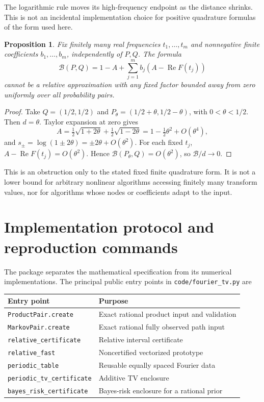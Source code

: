 \documentclass[11pt]{article}
\newtheorem{proposition}[theorem]{Proposition}
\theoremstyle{definition}
\theoremstyle{remark}
\DeclareMathOperator{\Rea}{Re}
\begin{document}
The logarithmic rule moves its high-frequency endpoint as the distance shrinks. This is not an incidental implementation choice for positive quadrature formulas of the form used here.

\begin{proposition}
\label{prop:fixedrule}
Fix finitely many real frequencies $t_1,\ldots,t_m$ and nonnegative finite coefficients $b_1,\ldots,b_m$, independently of $P,Q$. The formula
\[
 \mathcal B(P,Q)=1-A+\sum_{j=1}^m b_j(A-\Rea F(t_j))
\]
cannot be a relative approximation with any fixed factor bounded away from zero uniformly over all probability pairs.
\end{proposition}
\begin{proof}
Take $Q=(1/2,1/2)$ and $P_\theta=(1/2+\theta,1/2-\theta)$, with $0<\theta<1/2$. Then $d=\theta$. Taylor expansion at zero gives
\[
 A=\tfrac12\sqrt{1+2\theta}+\tfrac12\sqrt{1-2\theta}
   =1-\tfrac12\theta^2+O(\theta^4),
\]
and $s_\pm=\log(1\pm2\theta)=\pm2\theta+O(\theta^2)$. For each fixed $t_j$, $A-\Rea F(t_j)=O(\theta^2)$. Hence $\mathcal B(P_\theta,Q)=O(\theta^2)$, so $\mathcal B/d\to0$.
\end{proof}

This is an obstruction only to the stated fixed finite quadrature form. It is not a lower bound for arbitrary nonlinear algorithms accessing finitely many transform values, nor for algorithms whose nodes or coefficients adapt to the input.

\section{Implementation protocol and reproduction commands}
\label{app:reproduction}

The package separates the mathematical specification from its numerical implementations. The principal public entry points in \texttt{code/fourier\_tv.py} are
\begin{center}\small
\begin{tabular}{@{}ll@{}}
\toprule
Entry point & Purpose\\
\midrule
\texttt{ProductPair.create} & Exact rational product input and validation\\
\texttt{MarkovPair.create} & Exact rational fully observed path input\\
\texttt{relative\_certificate} & Relative interval certificate\\
\texttt{relative\_fast} & Noncertified vectorized prototype\\
\texttt{periodic\_table} & Reusable equally spaced Fourier data\\
\texttt{periodic\_tv\_certificate} & Additive TV enclosure\\
\texttt{bayes\_risk\_certificate} & Bayes-risk enclosure for a rational prior\\
\bottomrule
\end{tabular}
\end{center}
\end{document}
